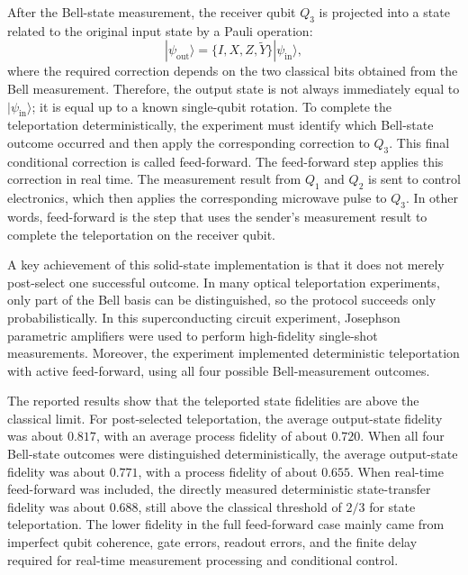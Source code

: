 \documentclass[aps,prd,preprint,floats,epsf,superscriptaddress,nofootinbib]{revtex4}
\begin{document}
After the Bell-state measurement, the receiver qubit $Q_3$ is projected into a state related to the original input state by a Pauli operation:
\begin{equation}
    |\psi_{\mathrm{out}}\rangle
    =
    \{ I, X, Z, \tilde{Y} \}
    |\psi_{\mathrm{in}}\rangle ,
\end{equation}
where the required correction depends on the two classical bits obtained from the Bell measurement. Therefore, the output state is not always immediately equal to $|\psi_{\mathrm{in}}\rangle$; it is equal up to a known single-qubit rotation. To complete the teleportation deterministically, the experiment must identify which Bell-state outcome occurred and then apply the corresponding correction to $Q_3$. This final conditional correction is called feed-forward. 
The feed-forward step applies this correction in real time. The measurement result from
$Q_1$ and $Q_2$ is sent to control electronics, which then applies the corresponding
microwave pulse to $Q_3$. In other words, feed-forward is the step that uses the sender's
measurement result to complete the teleportation on the receiver qubit.


A key achievement of this solid-state implementation is that it does not merely post-select one successful outcome. In many optical teleportation experiments, only part of the Bell basis can be distinguished, so the protocol succeeds only probabilistically. In this superconducting circuit experiment, Josephson parametric amplifiers were used to perform high-fidelity single-shot measurements. 
Moreover, the experiment implemented deterministic teleportation with active feed-forward, using all four possible Bell-measurement outcomes.

The reported results show that the teleported state fidelities are above the classical limit. For post-selected teleportation, the average output-state fidelity was about $0.817$, with an average process fidelity of about $0.720$. When all four Bell-state outcomes were distinguished deterministically, the average output-state fidelity was about $0.771$, with a process fidelity of about $0.655$. When real-time feed-forward was included, the directly measured deterministic state-transfer fidelity was about $0.688$, still above the classical threshold of $2/3$ for state teleportation. The lower fidelity in the full feed-forward case mainly came from imperfect qubit coherence, gate errors, readout errors, and the finite delay required for real-time measurement processing and conditional control.
\end{document}
